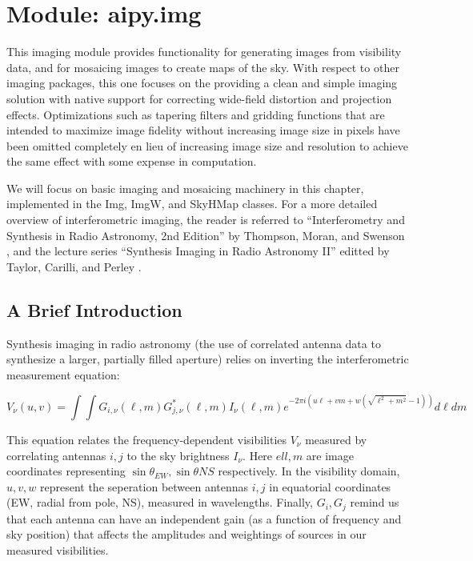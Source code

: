 \section{Module: aipy.img}
\label{sec:img}

This imaging module provides functionality for generating images from
visibility data, and for mosaicing images to create maps of the sky.  With
respect to other imaging packages, this one focuses on the providing a
clean and simple imaging solution with native support for correcting
wide-field distortion and projection effects.  Optimizations
such as tapering filters and gridding functions that are intended to
maximize image fidelity without increasing image size in pixels have been
omitted completely en lieu of increasing image size and resolution
to achieve the same effect with some expense in computation.

We will focus on basic imaging and mosaicing machinery in this chapter,
implemented in the Img, ImgW, and SkyHMap classes.  For a more detailed
overview of interferometric imaging, the reader is referred to
``Interferometry and Synthesis in Radio Astronomy, 2nd Edition'' by 
Thompson, Moran, and Swenson \cite{thompson_et_al2001}, and the lecture 
series ``Synthesis Imaging in Radio Astronomy II'' editted by Taylor, Carilli,
and Perley \cite{taylor_et_al1999}.

\subsection{A Brief Introduction}
\label{sec:img_intro}

Synthesis imaging in radio astronomy (the use of correlated antenna data to 
synthesize a larger, partially filled aperture) relies on inverting
the interferometric measurement equation:

\begin{equation}
V_{\nu}(u,v)=\int\!\!\!\!\int{G_{i,\nu}(\ell,m)G_{j,\nu}^*(\ell,m)
I_\nu(\ell,m)}
{e^{-2\pi i(u\ell+vm+w(\sqrt{\ell^2+m^2}-1))}d\ell dm}
\label{eq:meas_eq}
\end{equation}

This equation relates the frequency-dependent visibilities $V_\nu$ measured by
correlating antennas $i,j$ to the sky brightness $I_\nu$.  Here $ell,m$ are
image coordinates representing $\sin\theta_{EW},\sin\theta{NS}$
respectively.  In the visibility domain, $u,v,w$ represent the seperation
between antennas $i,j$ in equatorial coordinates (EW, radial from pole, NS),
measured in wavelengths. Finally, $G_i, G_j$ remind us that each antenna
can have an independent gain (as a function of frequency and sky position)
that affects the amplitudes and weightings of sources in our measured
visibilities.

